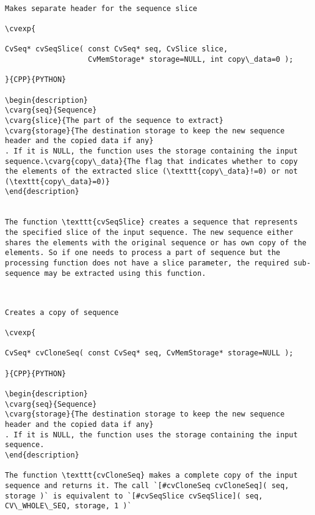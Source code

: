 \begin{verbatim}

Makes separate header for the sequence slice

\cvexp{

CvSeq* cvSeqSlice( const CvSeq* seq, CvSlice slice,
                   CvMemStorage* storage=NULL, int copy\_data=0 );

}{CPP}{PYTHON}

\begin{description}
\cvarg{seq}{Sequence}
\cvarg{slice}{The part of the sequence to extract}
\cvarg{storage}{The destination storage to keep the new sequence header and the copied data if any}
. If it is NULL, the function uses the storage containing the input sequence.\cvarg{copy\_data}{The flag that indicates whether to copy the elements of the extracted slice (\texttt{copy\_data}!=0) or not (\texttt{copy\_data}=0)}
\end{description}


The function \texttt{cvSeqSlice} creates a sequence that represents the specified slice of the input sequence. The new sequence either shares the elements with the original sequence or has own copy of the elements. So if one needs to process a part of sequence but the processing function does not have a slice parameter, the required sub-sequence may be extracted using this function.


\end{verbatim}
\begin{verbatim}

Creates a copy of sequence

\cvexp{

CvSeq* cvCloneSeq( const CvSeq* seq, CvMemStorage* storage=NULL );

}{CPP}{PYTHON}

\begin{description}
\cvarg{seq}{Sequence}
\cvarg{storage}{The destination storage to keep the new sequence header and the copied data if any}
. If it is NULL, the function uses the storage containing the input sequence.
\end{description}

The function \texttt{cvCloneSeq} makes a complete copy of the input sequence and returns it. The call `[#cvCloneSeq cvCloneSeq]( seq, storage )` is equivalent to `[#cvSeqSlice cvSeqSlice]( seq, CV\_WHOLE\_SEQ, storage, 1 )`


\end{verbatim}
